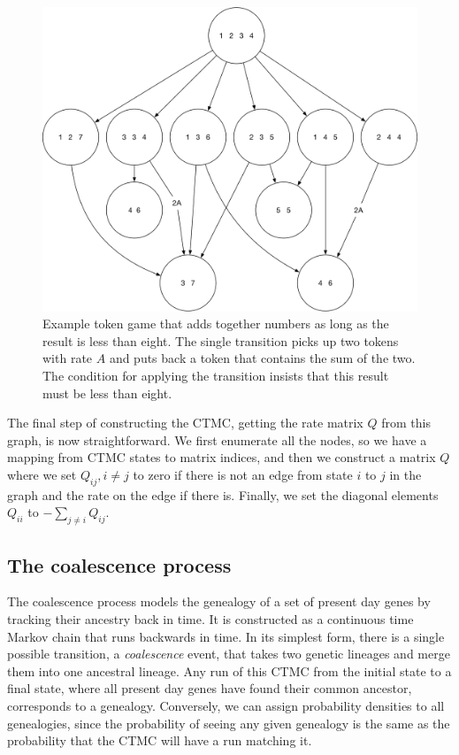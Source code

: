 \documentclass[graybox]{svmult}
\begin{document}
\begin{figure}[t]
\sidecaption[t]
\includegraphics[scale=.30]{figures/example-state-space-graph}
\caption{Example token game that adds together numbers as long as the result is less than eight. The single transition picks up two tokens with rate $A$ and puts back a token that contains the sum of the two. The condition for applying the transition insists that this result must be less than eight.}
\label{fig:example-state-space-graph}
\end{figure}

The final step of constructing the CTMC, getting the rate matrix $Q$ from this graph, is now straightforward. We first enumerate all the nodes, so we have a mapping from CTMC states to matrix indices, and then we construct a matrix $Q$ where we set $Q_{ij}, i\neq j$ to zero if there is not an edge from state $i$ to $j$ in the graph and the rate on the edge if there is. Finally, we set the diagonal elements $Q_{ii}$ to $-\sum_{j \neq i} Q_{ij}$.



\subsection{The coalescence process}

The coalescence process \cite{Hein:2004ta} models the genealogy of a set of present day genes by tracking their ancestry back in time. It is constructed as a continuous time Markov chain that runs backwards in time. In its simplest form, there is a single possible transition, a \emph{coalescence} event, that takes two genetic lineages and merge them into one ancestral lineage. Any run of this CTMC from the initial state to a final state, where all present day genes have found their common ancestor, corresponds to a genealogy. Conversely, we can assign probability densities to all genealogies, since the probability of seeing any given genealogy is the same as the probability that the CTMC will have a run matching it.
\end{document}

